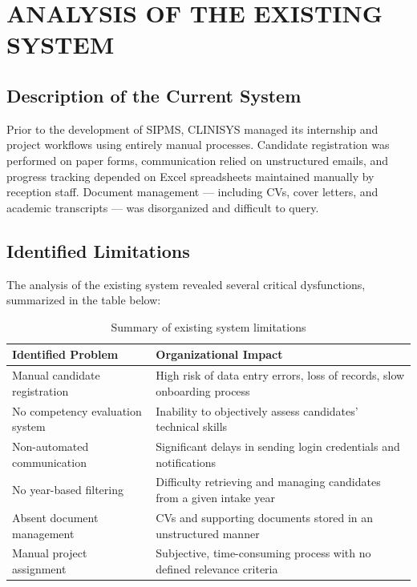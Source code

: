 \section{ANALYSIS OF THE EXISTING SYSTEM}

\subsection{Description of the Current System}
Prior to the development of SIPMS, CLINISYS managed its internship and project workflows using entirely manual processes. Candidate registration was performed on paper forms, communication relied on unstructured emails, and progress tracking depended on Excel spreadsheets maintained manually by reception staff. Document management — including CVs, cover letters, and academic transcripts — was disorganized and difficult to query.

\subsection{Identified Limitations}
The analysis of the existing system revealed several critical dysfunctions, summarized in the table below:

\begin{table}[H]
\centering
\begin{tabular}{|p{4.5cm}|p{8.5cm}|}
\hline
\rowcolor{gray!20}
\textbf{Identified Problem} & \textbf{Organizational Impact} \\
\hline
Manual candidate registration & High risk of data entry errors, loss of records, slow onboarding process \\
\hline
No competency evaluation system & Inability to objectively assess candidates' technical skills \\
\hline
Non-automated communication & Significant delays in sending login credentials and notifications \\
\hline
No year-based filtering & Difficulty retrieving and managing candidates from a given intake year \\
\hline
Absent document management & CVs and supporting documents stored in an unstructured manner \\
\hline
Manual project assignment & Subjective, time-consuming process with no defined relevance criteria \\
\hline
\end{tabular}
\caption{Summary of existing system limitations}
\end{table}

